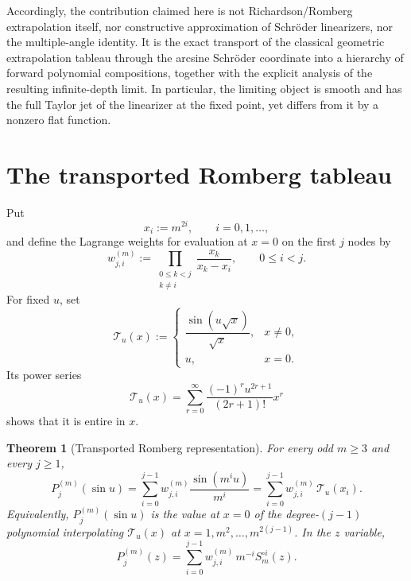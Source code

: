 \documentclass[11pt]{article}
\newtheorem{theorem}{Theorem}[section]
\theoremstyle{remark}
\begin{document}
Accordingly, the contribution claimed here is not Richardson/Romberg
extrapolation itself, nor constructive approximation of Schr\"oder linearizers,
nor the multiple-angle identity.  It is the exact transport of the classical
geometric extrapolation tableau through the arcsine Schr\"oder coordinate into
a hierarchy of forward polynomial compositions, together with the explicit
analysis of the resulting infinite-depth limit.  In particular, the limiting
object is smooth and has the full Taylor jet of the linearizer at the fixed
point, yet differs from it by a nonzero flat function.

\section{The transported Romberg tableau}
\label{sec:romberg}

Put
\[
x_i:=m^{2i},\qquad i=0,1,\ldots,
\]
and define the Lagrange weights for evaluation at $x=0$ on the first $j$ nodes
by
\begin{equation}
w^{(m)}_{j,i}
:=
\prod_{\substack{0\le k<j\\k\ne i}}
\frac{x_k}{x_k-x_i},
\qquad 0\le i<j.
\label{eq:finiteweights}
\end{equation}
For fixed $u$, set
\begin{equation}
\mathcal T_u(x)
:=
\begin{cases}
\dfrac{\sin(u\sqrt{x})}{\sqrt{x}},&x\ne0,\\[1ex]
u,&x=0.
\end{cases}
\label{eq:Tux}
\end{equation}
Its power series
\[
\mathcal T_u(x)
=
\sum_{r=0}^{\infty}
\frac{(-1)^r u^{2r+1}}{(2r+1)!}x^r
\]
shows that it is entire in $x$.

\begin{theorem}[Transported Romberg representation]
\label{thm:representation}
For every odd $m\ge3$ and every $j\ge1$,
\begin{equation}
P^{(m)}_j(\sin u)
=
\sum_{i=0}^{j-1}w^{(m)}_{j,i}
\frac{\sin(m^iu)}{m^i}
=
\sum_{i=0}^{j-1}w^{(m)}_{j,i}\,\mathcal T_u(x_i).
\label{eq:representation}
\end{equation}
Equivalently, $P^{(m)}_j(\sin u)$ is the value at $x=0$ of the degree-$(j-1)$
polynomial interpolating $\mathcal T_u(x)$ at
$x=1,m^2,\ldots,m^{2(j-1)}$.
In the $z$ variable,
\begin{equation}
P^{(m)}_j(z)
=
\sum_{i=0}^{j-1}w^{(m)}_{j,i}\,m^{-i}
S_m^{\circ i}(z).
\label{eq:iterateform}
\end{equation}
\end{theorem}
\end{document}
